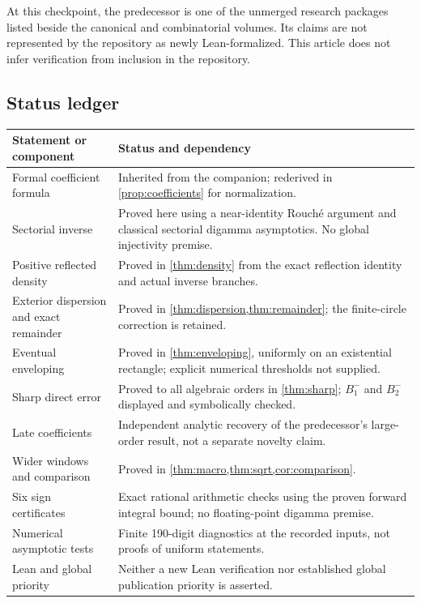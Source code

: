 \documentclass[11pt,a4paper]{article}
\theoremstyle{definition}
\numberwithin{equation}{section}
\begin{document}
At this checkpoint, the predecessor is one of the unmerged research
packages listed beside the canonical and combinatorial volumes. Its
claims are not represented by the repository as newly Lean-formalized.
This article does not infer verification from inclusion in the repository.

\clearpage
\subsection{Status ledger}
\begin{longtable}{p{}p{}}
\toprule
Statement or component & Status and dependency\\
\midrule
\endhead
Formal coefficient formula & Inherited from the companion; rederived in
\cref{prop:coefficients} for normalization.\\[3pt]
Sectorial inverse & Proved here using a near-identity Rouch\'e argument
and classical sectorial digamma asymptotics. No global injectivity premise.\\[3pt]
Positive reflected density & Proved in \cref{thm:density} from the exact
reflection identity and actual inverse branches.\\[3pt]
Exterior dispersion and exact remainder & Proved in
\cref{thm:dispersion,thm:remainder}; the finite-circle correction is retained.\\[3pt]
Eventual enveloping & Proved in \cref{thm:enveloping}, uniformly on an
existential rectangle; explicit numerical thresholds not supplied.\\[3pt]
Sharp direct error & Proved to all algebraic orders in \cref{thm:sharp};
$B_1^-$ and $B_2^-$ displayed and symbolically checked.\\[3pt]
Late coefficients & Independent analytic recovery of the predecessor's
large-order result, not a separate novelty claim.\\[3pt]
Wider windows and comparison & Proved in
\cref{thm:macro,thm:sqrt,cor:comparison}.\\[3pt]
Six sign certificates & Exact rational arithmetic checks using the proven
forward integral bound; no floating-point digamma premise.\\[3pt]
Numerical asymptotic tests & Finite 190-digit diagnostics at the recorded
inputs, not proofs of uniform statements.\\[3pt]
Lean and global priority & Neither a new Lean verification nor established
global publication priority is asserted.\\
\bottomrule
\end{longtable}
\end{document}
